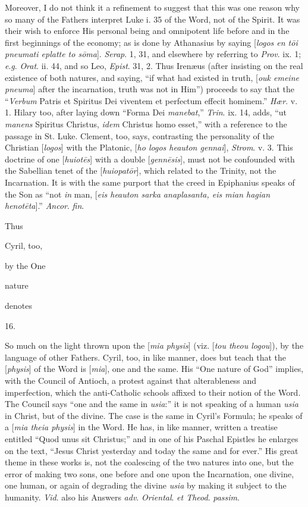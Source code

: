 Moreover, I do not think it a refinement to
suggest that this was one reason why so many of the Fathers
interpret Luke i. 35 of the Word, not of the Spirit. It was
their wish to enforce His personal being and omnipotent life
before and in the first beginnings of the economy; as is done
by Athanasius by saying [\emph{logos en t\={o}i pneumati
eplatte to s\={o}ma}]. \emph{Serap}. 1, 31, and
elsewhere by referring to \emph{Prov}. ix. 1; \emph{e}.\emph{g}.
\emph{Orat}. ii. 44, and so Leo, \emph{Epist}. 31, 2. Thus
Irenæus (after insisting on the real existence of both
natures, and saying, ``if what had existed in truth, [\emph{ouk
emeine pneuma}] after the incarnation, truth was not in
Him'') proceeds to say that the ``\emph{Verbum} Patris et
Spiritus Dei viventem et perfectum effecit hominem.'' \emph{Hær}.
v. 1. Hilary too, after laying down ``Forma Dei \emph{manebat},''
\emph{Trin}. ix. 14, adds, ``ut \emph{manens} Spiritus
Christus, \emph{idem} Christus homo esset,'' with a reference to the passage in St. Luke. Clement, too, says,
contrasting the personality of the Christian [\emph{logos}]
with the Platonic, [\emph{ho logos heauton gennai}], \emph{Strom}.
v. 3. This doctrine of one [\emph{huiot\={e}s}] with a
double [\emph{genn\={e}sis}], must not be confounded with
the Sabellian tenet of the [\emph{huiopat\={o}r}], which
related to the Trinity, not the Incarnation. It is with the
same purport that the creed in Epiphanius speaks of the Son as
``not \emph{in} man, [\emph{eis heauton sarka anaplasanta, eis
mian hagian henot\={e}ta}].'' \emph{Ancor}. \emph{fin}.

Thus

Cyril, too,

by the One

nature

denotes

16.

So much on the light
thrown upon the [\emph{mia physis}] (viz. [\emph{tou theou logou}]),
by the language of other Fathers. Cyril, too, in like manner,
does but teach that the [\emph{physis}] of the Word is [\emph{mia}],
one and the same. His ``One nature of God'' implies, with
the Council of Antioch, a protest against that alterableness
and imperfection, which the anti-Catholic schools affixed to
their notion of the Word. The Council says ``one and the same
in \emph{usia}:'' it is not speaking of a human \emph{usia}
in Christ, but of the divine. The case is the same in
Cyril's Formula; he speaks of a [\emph{mia theia physis}] in
the Word. He has, in like manner, written a treatise entitled ``Quod unus sit Christus;'' and in one of his Paschal
Epistles he enlarges on the text, ``Jesus Christ yesterday
and today the same and for ever.'' His great theme in these
works is, not the coalescing of the two natures into one, but
the error of making two sons, one before and one upon the
Incarnation, one divine, one human, or again of degrading the
divine \emph{usia} by making it subject to the humanity.
\emph{Vid}. also his Answers \emph{adv}. \emph{Oriental}. \emph{et
Theod}. \emph{passim}.

